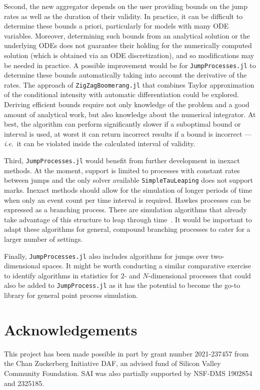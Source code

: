 \documentclass{juliacon}
\numberwithin{equation}{section}
\newcommand{\ie}{\textit{i}.\textit{e}.}
\begin{document}
Second, the new aggregator depends on the user providing bounds on the jump rates as well as the duration of their validity. In practice, it can be difficult to determine these bounds a priori, particularly for models with many ODE variables. Moreover, determining such bounds from an analytical solution or the underlying ODEs does not guarantee their holding for the numerically computed solution (which is obtained via an ODE discretization), and so modifications may be needed in practice. A possible improvement would be for \texttt{JumpProcesses.jl} to determine these bounds automatically taking into account the derivative of the rates. The approach of \texttt{ZigZagBoomerang.jl} that combines Taylor approximation of the conditional intensity with automatic differentiation could be explored. Deriving efficient bounds require not only knowledge of the problem and a good amount of analytical work, but also knowledge about the numerical integrator. At best, the algorithm can perform significantly slower if a suboptimal bound or interval is used, at worst it can return incorrect results if a bound is incorrect --- \ie~it can be violated inside the calculated interval of validity. 

Third, \texttt{JumpProcesses.jl} would benefit from further development in inexact methods. At the moment, support is limited to processes with constant rates between jumps and the only solver available \texttt{SimpleTauLeaping} does not support marks. Inexact methods should allow for the simulation of longer periods of time when only an event count per time interval is required. Hawkes processes can be expressed as a branching process. There are simulation algorithms that already take advantage of this structure to leap through time~\cite{laub2021}. It would be important to adapt these algorithms for general, compound branching processes to cater for a larger number of settings. 

Finally, \texttt{JumpProcesses.jl} also includes algorithms for jumps over two-dimensional spaces. It might be worth conducting a similar comparative exercise to identify algorithms in statistics for \(2 \)- and \( N \)-dimensional processes that could also be added to \texttt{JumpProcess.jl} as it has the potential to become the go-to library for general point process simulation.

\section{Acknowledgements}
This project has been made possible in part by grant number 2021-237457 from the Chan Zuckerberg Initiative DAF, an advised fund of Silicon Valley Community Foundation. SAI was also partially supported by NSF-DMS 1902854 and 2325185.
\end{document}
